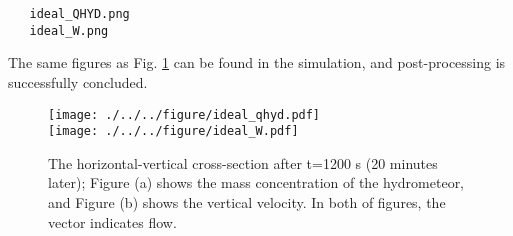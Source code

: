 \begin{verbatim}
   ideal_QHYD.png
   ideal_W.png
\end{verbatim}
The same figures as Fig. \ref{fig_ideal} can be found in the simulation,
and post-processing is successfully concluded.

\begin{figure}[htb]
\begin{center}
  \texttt{[image: ./../../figure/ideal\_qhyd.pdf]}\\
  \texttt{[image: ./../../figure/ideal\_W.pdf]}\\
  \caption{The horizontal-vertical cross-section after t=1200 s (20 minutes later);
            Figure (a) shows the mass concentration of the hydrometeor, and 
            Figure (b) shows the vertical velocity. 
            In both of figures, the vector indicates flow.}
  \label{fig_ideal}
\end{center}
\end{figure}

